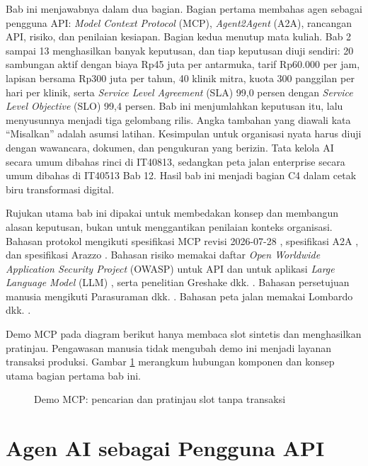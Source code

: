 Bab ini menjawabnya dalam dua bagian. Bagian pertama membahas agen sebagai pengguna API: \textit{Model Context Protocol} (MCP),
\textit{Agent2Agent} (A2A), rancangan API, risiko, dan penilaian kesiapan. Bagian kedua menutup mata kuliah. Bab 2 sampai 13 menghasilkan
banyak keputusan, dan tiap keputusan diuji sendiri: 20 sambungan aktif dengan biaya Rp45 juta per antarmuka, tarif Rp60.000 per jam, lapisan
bersama Rp300 juta per tahun, 40 klinik mitra, kuota 300 panggilan per hari per klinik, serta \textit{Service Level Agreement} (SLA) 99,0
persen dengan \textit{Service Level Objective} (SLO) 99,4 persen. Bab ini menjumlahkan keputusan itu, lalu menyusunnya menjadi tiga gelombang
rilis. Angka tambahan yang diawali kata ``Misalkan'' adalah asumsi latihan. Kesimpulan untuk organisasi nyata harus diuji dengan wawancara,
dokumen, dan pengukuran yang berizin. Tata kelola AI secara umum dibahas rinci di IT40813, sedangkan peta jalan enterprise secara umum
dibahas di IT40513 Bab 12. Hasil bab ini menjadi bagian C4 dalam cetak biru transformasi digital.

Rujukan utama bab ini dipakai untuk membedakan konsep dan membangun alasan keputusan, bukan untuk menggantikan penilaian konteks organisasi.
Bahasan protokol mengikuti spesifikasi MCP revisi 2026-07-28 \cite{mcp2026}, spesifikasi A2A \cite{c14-a2a}, dan spesifikasi Arazzo
\cite{c14-arazzo}. Bahasan risiko memakai daftar \textit{Open Worldwide Application Security Project} (OWASP) untuk API \cite{owasp-api2023} dan
untuk aplikasi \textit{Large Language Model} (LLM) \cite{c14-owasp-llm2025}, serta penelitian Greshake dkk. \cite{c14-greshake2023}. Bahasan
persetujuan manusia mengikuti Parasuraman dkk. \cite{c14-parasuraman2000}. Bahasan peta jalan memakai Lombardo dkk. \cite{c14-lombardo2017}.

Demo MCP pada diagram berikut hanya membaca slot sintetis dan menghasilkan pratinjau. Pengawasan manusia tidak mengubah demo ini menjadi
layanan transaksi produksi. Gambar \ref{fig:ch14-agen-terkendali} merangkum hubungan komponen dan konsep utama bagian pertama bab ini.
\begin{figure}[!htb]
  \centering
  
  \caption{Demo MCP: pencarian dan pratinjau slot tanpa transaksi}
  \label{fig:ch14-agen-terkendali}
\end{figure}

\section{Agen AI sebagai Pengguna API}

